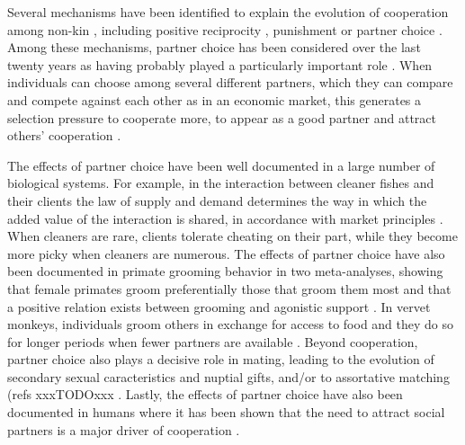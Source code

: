 Several mechanisms have been identified to explain the evolution of cooperation among non-kin \citep{Trivers1971, MaynardSmith1974, Axelrod1981}, including positive reciprocity \cite{Trivers1971, Axelrod1981, Andre2007}, punishment \cite{Bshary2005, Raihani2012} or partner choice \cite{Eshel1982, Bull1991, West2007, Schino2017}. Among these mechanisms, partner choice has been considered over the last twenty years as having probably played a particularly important role \cite{Baumard2013a, +ref}. When individuals can choose among several different partners, which they can compare and compete against each other as in an economic market, this generates a selection pressure to cooperate more, to appear as a good partner and attract others' cooperation \cite{Noe1994}.

The effects of partner choice have been well documented in a large number of biological systems. For example, in the interaction between cleaner fishes and their clients the law of supply and demand determines the way in which the added value of the interaction is shared, in accordance with market principles \cite{Bshary2006}. When cleaners are rare, clients tolerate cheating on their part, while they become more picky when cleaners are numerous. The effects of partner choice have also been documented in primate grooming behavior in two meta-analyses, showing that female primates groom preferentially those that groom them most and that a positive relation exists between grooming and agonistic support \citep{Schino2007, Schino2008}. In vervet monkeys, individuals groom others in exchange for access to food and they do so for longer periods when fewer partners are available \cite{Fruteau2009}. Beyond cooperation, partner choice also plays a decisive role in mating, leading to the evolution of secondary sexual caracteristics and nuptial gifts, and/or to assortative matching (refs xxxTODOxxx \cite{Zahavi1975, xxTerrain}. Lastly, the effects of partner choice have also been documented in humans where it has been shown that the need to attract social partners is a major driver of cooperation \citep{Barclay2007a, Barclay2015, Barclay2016, Debove2015b,  Andre2011, Baumard2013a}.



